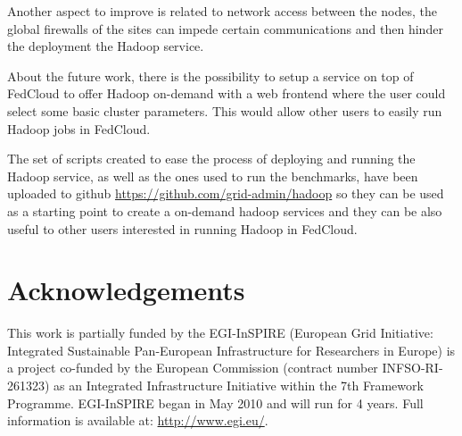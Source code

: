 \documentclass[oribibl]{llncs_Ibergrid2013}
\begin{document}
Another aspect to improve is related to network access between the nodes, the global firewalls of the sites can impede certain communications and then hinder the deployment the Hadoop service.



About the future work, there is the possibility to setup a service on top of FedCloud to offer Hadoop on-demand with a web frontend where the user could select some basic cluster parameters. This would allow other users to easily run Hadoop jobs in FedCloud.

 
The set of scripts created to ease the process of deploying and running the Hadoop service, as well as the ones used to run the benchmarks, have been uploaded to github  \url{https://github.com/grid-admin/hadoop} so they can be used as a starting point to create a on-demand hadoop services and they can be also useful to other users interested in running Hadoop in FedCloud.


\section*{Acknowledgements}
\label{sect-acknowledgements}
This work is partially funded by the  EGI-InSPIRE (European Grid Initiative: Integrated Sustainable
Pan-European Infrastructure for Researchers in Europe) is a project co-funded by the European Commission 
(contract number INFSO-RI-261323) as an Integrated Infrastructure Initiative within the 7th Framework 
Programme. EGI-InSPIRE began in May 2010 and will run for 4 years. Full information is available at:
\url{http://www.egi.eu/}.

%
%
%


\end{document}
